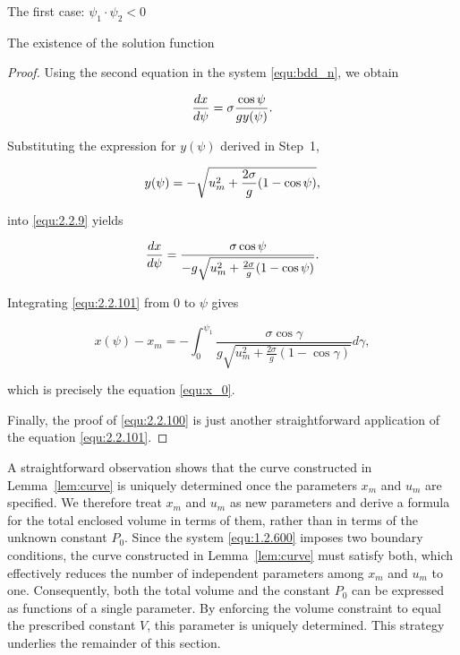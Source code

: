 \documentclass[letterpaper,reqno,10pt,twoside]{amsart}
\theoremstyle{definition}
\theoremstyle{remark}
\begin{document}
\begin{section}{The first case: $\psi_1\cdot \psi_2<0$ }
\begin{subsection}{The existence of the solution function}
\begin{proof}
 Using the second equation in the system \eqref{equ:bdd_n}, we obtain

        \begin{equation}{\label{equ:2.2.9}}
            \frac{dx}{d\psi}=\sigma\frac{\cos\psi}{gy(\psi)}.
        \end{equation}

        \noindent Substituting the expression for $y(\psi)$ derived in Step~1,

        \begin{equation}{\label{equ:2.2.10}}
            y(\psi)=-\sqrt{u_{m}^{2}+\frac{2\sigma}{g}(1-\cos\psi)},
        \end{equation}

        \noindent into \eqref{equ:2.2.9} yields

        \begin{equation}{\label{equ:2.2.101}}
            \frac{dx}{d\psi}=\frac{\sigma\cos\psi}{-g\sqrt{u_{m}^{2}+\frac{2\sigma}{g}(1-\cos\psi)}}.
        \end{equation}

        Integrating \eqref{equ:2.2.101} from $0$ to $\psi$ gives

        \begin{equation*}
            x(\psi)-x_m=-\int_{0}^{\psi_1}\frac{\sigma\cos\gamma}{g\sqrt{u_{m}^{2}+\frac{2\sigma}{g}(1-\cos\gamma)}}d\gamma,
        \end{equation*}

    \noindent which is precisely the equation \eqref{equ:x_0}.
    
    Finally, the proof of \eqref{equ:2.2.100} is just another straightforward application of the equation \eqref{equ:2.2.101}. 
    \end{proof}
    
     A straightforward observation shows that the curve constructed in Lemma~\ref{lem:curve} is uniquely determined once the parameters $x_{m}$ and $u_{m}$ are specified. We therefore treat $x_{m}$ and $u_{m}$ as new parameters and derive a formula for the total enclosed volume in terms of them, rather than in terms of the unknown constant $P_{0}$. Since the system \eqref{equ:1.2.600} imposes two boundary conditions, the curve constructed in Lemma~\ref{lem:curve} must satisfy both, which effectively reduces the number of independent parameters among $x_{m}$ and $u_{m}$ to one. Consequently, both the total volume and the constant $P_{0}$ can be expressed as functions of a single parameter. By enforcing the volume constraint to equal the prescribed constant $V$, this parameter is uniquely determined. This strategy underlies the remainder of this section.


\end{subsection}
\end{section}
\end{document}
